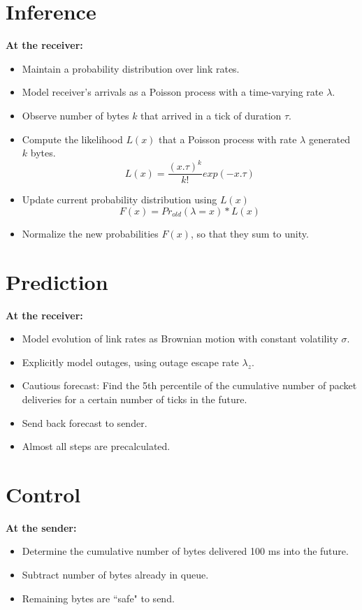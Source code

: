 \begin{multicols}{2}
\section*{Inference}
\begin{center}
\def\svgwidth{0.7 \columnwidth}
\end{center}
{\large \bf
At the receiver:
\begin{itemize}
\item Maintain a probability distribution over link rates.
\item Model receiver's arrivals as a Poisson process with a time-varying rate $\lambda$.
\item Observe number of bytes $k$ that arrived in a tick of duration $\tau$.
\item Compute the likelihood $L(x)$ that a Poisson process with rate $\lambda$ generated $k$ bytes.
      \begin{equation}
       L(x) = \frac{(x.\tau)^{k}}{k!}exp(-x.\tau)
      \end{equation}
\item Update current probability distribution using $L(x)$
      \begin{equation}
       F(x) = Pr_{old}(\lambda = x)*L(x)
      \end{equation}
\item Normalize the new probabilities $F(x)$, so that they sum to unity.
\end{itemize}
}

\section*{Prediction}
{\large \bf
At the receiver:
\begin{itemize}
\item Model evolution of link rates as Brownian motion with constant volatility $\sigma$.
\item Explicitly model outages, using outage escape rate $\lambda_{z}$.
\item Cautious forecast: Find the 5th percentile of the cumulative number of packet deliveries for a certain number of ticks in the future.
\item Send back forecast to sender.
\item Almost all steps are precalculated.
\end{itemize}
}


\section*{Control}
{\large \bf
At the sender:
\begin{itemize}
\item Determine the cumulative number of bytes delivered 100 ms into the future.
\item Subtract number of bytes already in queue.
\item Remaining bytes are ``safe" to send.
\end{itemize}
}


\end{multicols}
